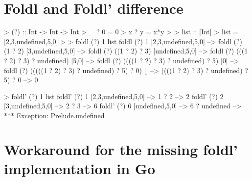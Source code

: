 \section{Foldl and Foldl' difference}\label{appendix:foldl-strictness}
\begin{code}
    \begin{haskellcode}
> (?) :: Int -> Int -> Int
> _ ? 0 = 0
> x ? y = x*y
>
> list :: [Int]
> list = [2,3,undefined,5,0]
>
> foldl (?) 1 list
foldl (?) 1 [2,3,undefined,5,0] -->
foldl (?) (1 ? 2) [3,undefined,5,0] -->
foldl (?) ((1 ? 2) ? 3) [undefined,5,0] -->
foldl (?) (((1 ? 2) ? 3) ? undefined) [5,0] -->
foldl (?) ((((1 ? 2) ? 3) ? undefined) ? 5) [0] -->
foldl (?) (((((1 ? 2) ? 3) ? undefined) ? 5) ? 0) [] -->
((((1 ? 2) ? 3) ? undefined) ? 5) ? 0 -->
0

> foldl' (?) 1 list
foldl' (?) 1 [2,3,undefined,5,0] -->
    1 ? 2 --> 2
foldl' (?) 2 [3,undefined,5,0] -->
    2 ? 3 --> 6
foldl' (?) 6 [undefined,5,0] -->
    6 ? undefined -->
*** Exception: Prelude.undefined
    \end{haskellcode}
\end{code}

\section{Workaround for the missing foldl' implementation in Go}\label{appendix:foldl-go}
\begin{code}
	\label{code:foldl-go}
\end{code}

